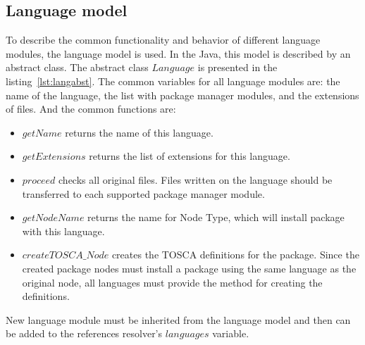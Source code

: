 \subsection*{Language model}
To describe the common functionality and behavior of different language modules, the language model is used. 
In the Java, this model is described by an abstract class. 
The abstract class $Language$ is presented in the listing~\ref{lst:langabst}.
The common variables for all language modules are: the name of the language, the list with package manager modules, and the extensions of files.
And the common functions are: 
\begin{itemize}
	\item $getName$ returns the name of this language.
	\item $getExtensions$ returns the list of extensions for this language.
	\item $proceed$ checks all original files.  
	Files written on the language should be transferred to each supported package manager module.
	\item $getNodeName$ returns the name for Node Type, which will install package with this language.
	\item $createTOSCA\_Node$ creates the TOSCA definitions for the package. 
	Since the created package nodes must install a package using the same language as the original node, all languages must provide the method for creating the definitions.
\end{itemize}
New language module must be inherited from the language model and then can be added to the references resolver's $languages$ variable.

